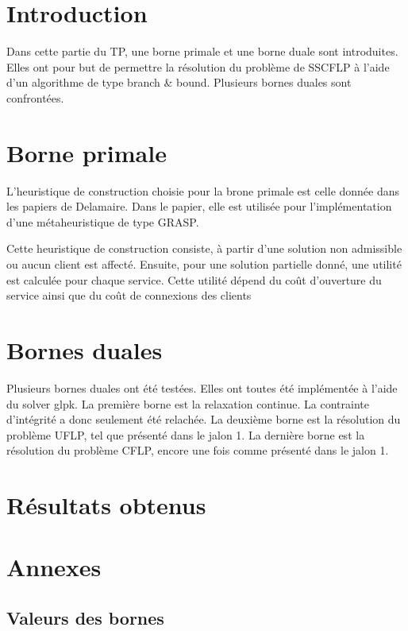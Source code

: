 \section{Introduction}

Dans cette partie du TP, une borne primale et une borne duale sont introduites.
Elles ont pour but de permettre la résolution du problème de SSCFLP à l'aide d'un algorithme de type branch \& bound.
Plusieurs bornes duales sont confrontées.

\section{Borne primale}

L'heuristique de construction choisie pour la brone primale est celle donnée dans les papiers de Delamaire.
Dans le papier, elle est utilisée pour l'implémentation d'une métaheuristique de type GRASP. \newline

Cette heuristique de construction consiste, à partir d'une solution non admissible ou aucun client est affecté.
Ensuite, pour une solution partielle donné, une utilité est calculée pour chaque service.
Cette utilité dépend du coût d'ouverture du service ainsi que du coût de connexions des clients

\section{Bornes duales}

Plusieurs bornes duales ont été testées. Elles ont toutes été implémentée à l'aide du solver glpk.
La première borne est la relaxation continue. La contrainte d'intégrité a donc seulement été relachée.
La deuxième borne est la résolution du problème UFLP, tel que présenté dans le jalon 1.
La dernière borne est la résolution du problème CFLP, encore une fois comme présenté dans le jalon 1.

\section{Résultats obtenus}

\section{Annexes}

\subsection{Valeurs des bornes}

